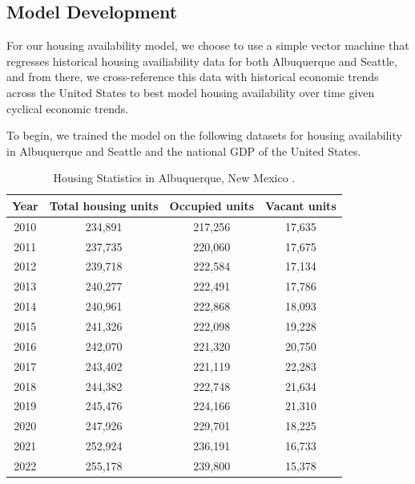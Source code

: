 \documentclass[12pt]{article}
\begin{document}
\subsection{Model Development}
For our housing availability model, we choose to use a simple vector machine that regresses historical housing availiability
data for both Albuquerque and Seattle, and from there, we cross-reference this data with historical economic trends
across the United States to best model housing availability over time given cyclical economic trends.

\noindent
To begin, we trained the model on the following datasets for housing availability in Albuquerque and Seattle and the
national GDP of the United States.

\begin{table}[H]
  \centering
  \begin{tabular}{|c c c c|} 
    \hline 
    Year & Total housing units & Occupied units & Vacant units \\ [0.5ex]
    \hline
    2010  &  234,891 & 217,256 & 17,635 \\
    2011  &  237,735 & 220,060 & 17,675 \\
    2012  &  239,718 & 222,584 & 17,134 \\
    2013  &  240,277 & 222,491 & 17,786 \\
    2014  &  240,961 & 222,868 & 18,093 \\
    2015  &  241,326 & 222,098 & 19,228 \\
    2016  &  242,070 & 221,320 & 20,750 \\
    2017  &  243,402 & 221,119 & 22,283 \\
    2018  &  244,382 & 222,748 & 21,634 \\
    2019  &  245,476 & 224,166 & 21,310 \\
    2020  &  247,926 & 229,701 & 18,225 \\
    2021  &  252,924 & 236,191 & 16,733 \\
    2022  &  255,178 & 239,800 & 15,378 \\ [1ex] 
    \hline
  \end{tabular}
  \caption{Housing Statistics in Albuquerque, New Mexico \cite{Census2010ACSDP1Y2010.DP04}.}
\end{table}
\end{document}

